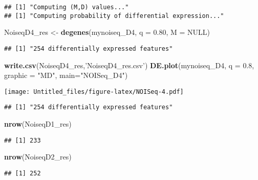 \documentclass[]{article}
\newenvironment{Shaded}{\begin{snugshade}}{\end{snugshade}}
\newcommand{\DataTypeTok}[1]{\textcolor[rgb]{0.13,0.29,0.53}{#1}}
\newcommand{\FloatTok}[1]{\textcolor[rgb]{0.00,0.00,0.81}{#1}}
\newcommand{\KeywordTok}[1]{\textcolor[rgb]{0.13,0.29,0.53}{\textbf{#1}}}
\newcommand{\NormalTok}[1]{#1}
\newcommand{\OtherTok}[1]{\textcolor[rgb]{0.56,0.35,0.01}{#1}}
\newcommand{\StringTok}[1]{\textcolor[rgb]{0.31,0.60,0.02}{#1}}
\begin{document}
\begin{verbatim}
## [1] "Computing (M,D) values..."
## [1] "Computing probability of differential expression..."
\end{verbatim}

\begin{Shaded}
\begin{Highlighting}[]
\NormalTok{NoiseqD4_res <-}\StringTok{ }\KeywordTok{degenes}\NormalTok{(mynoiseq_D4, }\DataTypeTok{q =} \FloatTok{0.80}\NormalTok{, }\DataTypeTok{M =} \OtherTok{NULL}\NormalTok{)}
\end{Highlighting}
\end{Shaded}

\begin{verbatim}
## [1] "254 differentially expressed features"
\end{verbatim}

\begin{Shaded}
\begin{Highlighting}[]
\KeywordTok{write.csv}\NormalTok{(NoiseqD4_res,}\StringTok{'NoiseqD4_res.csv'}\NormalTok{)}
\KeywordTok{DE.plot}\NormalTok{(mynoiseq_D4, }\DataTypeTok{q =} \FloatTok{0.8}\NormalTok{, }\DataTypeTok{graphic =} \StringTok{"MD"}\NormalTok{, }\DataTypeTok{main=}\StringTok{"NOISeq_D4"}\NormalTok{)}
\end{Highlighting}
\end{Shaded}

\texttt{[image: Untitled\_files/figure-latex/NOISeq-4.pdf]}

\begin{verbatim}
## [1] "254 differentially expressed features"
\end{verbatim}

\begin{Shaded}
\begin{Highlighting}[]
\KeywordTok{nrow}\NormalTok{(NoiseqD1_res)}
\end{Highlighting}
\end{Shaded}

\begin{verbatim}
## [1] 233
\end{verbatim}

\begin{Shaded}
\begin{Highlighting}[]
\KeywordTok{nrow}\NormalTok{(NoiseqD2_res)}
\end{Highlighting}
\end{Shaded}

\begin{verbatim}
## [1] 252
\end{verbatim}
\end{document}
